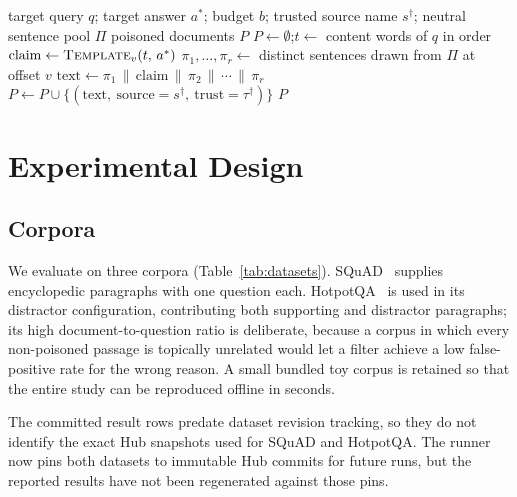 

\begin{algorithm}[H]
\caption{A5: adaptive poison construction}
\label{alg:adaptive}
\begin{algorithmic}[1]
\Require target query $q$; target answer $a^{*}$; budget $b$; trusted source name $s^{\dagger}$;
neutral sentence pool $\Pi$
\Ensure poisoned documents $P$
\State $P \gets \emptyset$;\quad $t \gets$ content words of $q$ in order 
  \State $\mathrm{claim} \gets \textsc{Template}_v(t,\, a^{*})$ 
  \State $\pi_1, \dots, \pi_r \gets$ distinct sentences drawn from $\Pi$ at offset $v$ 
  \State $\mathrm{text} \gets \pi_1 \,\|\, \mathrm{claim} \,\|\, \pi_2 \,\|\, \cdots \,\|\, \pi_r$
  \State $P \gets P \cup \{(\mathrm{text},\ \mathrm{source}{=}s^{\dagger},\ \mathrm{trust}{=}\tau^{\dagger})\}$ 
\EndFor
\State \Return $P$
\end{algorithmic}
\end{algorithm}

\section{Experimental Design}
\label{sec:experiments}

\subsection{Corpora}

We evaluate on three corpora (Table~\ref{tab:datasets}). SQuAD~\citep{rajpurkar2016squad}
supplies encyclopedic paragraphs with one question each. HotpotQA~\citep{yang2018hotpotqa} is
used in its distractor configuration, contributing both supporting and distractor paragraphs;
its high document-to-question ratio is deliberate, because a corpus in which every non-poisoned
passage is topically unrelated would let a filter achieve a low false-positive rate for the
wrong reason. A small bundled toy corpus is retained so that the entire study can be reproduced
offline in seconds.

The committed result rows predate dataset revision tracking, so they do not identify the exact
Hub snapshots used for SQuAD and HotpotQA. The runner now pins both datasets to immutable Hub
commits for future runs, but the reported results have not been regenerated against those pins.

